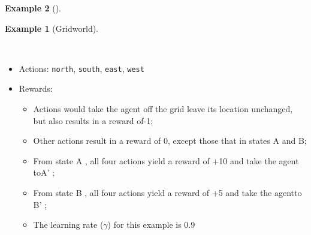 \documentclass[
  letterpaper,
]{krantz}
\providecommand{\tightlist}{%
  \setlength{\itemsep}{0pt}\setlength{\parskip}{0pt}}\usepackage{longtable,booktabs,array}
\theoremstyle{plain}
\theoremstyle{definition}
\newtheorem{example}{Example}[chapter]
\theoremstyle{definition}
\theoremstyle{remark}
\begin{document}
\begin{example}[]
\begin{tcolorbox}[enhanced jigsaw, bottomrule=.15mm, opacityback=0, breakable, colframe=quarto-callout-tip-color-frame, left=2mm, rightrule=.15mm, toprule=.15mm, leftrule=.75mm, arc=.35mm, colback=white]
\begin{codelisting}[H]
\end{codelisting}

\end{tcolorbox}

\begin{example}[Gridworld]\protect\hypertarget{exm-grid_world}{}\label{exm-grid_world}

~

\begin{itemize}
\item
  Actions: \texttt{north}, \texttt{south}, \texttt{east}, \texttt{west}
\item
  Rewards:

  \begin{itemize}
  \tightlist
  \item
    Actions would take the agent off the grid leave its location
    unchanged, but also results in a reward of-1;
  \item
    Other actions result in a reward of 0, except those that in states A
    and B;
  \item
    From state A , all four actions yield a reward of +10 and take the
    agent toA' ;
  \item
    From state B , all four actions yield a reward of +5 and take the
    agentto B' ;
  \item
    The learning rate (\(\gamma\)) for this example is 0.9
  \end{itemize}
\end{itemize}

\begin{figure}

\end{figure}
\end{example}
\end{example}
\end{document}
